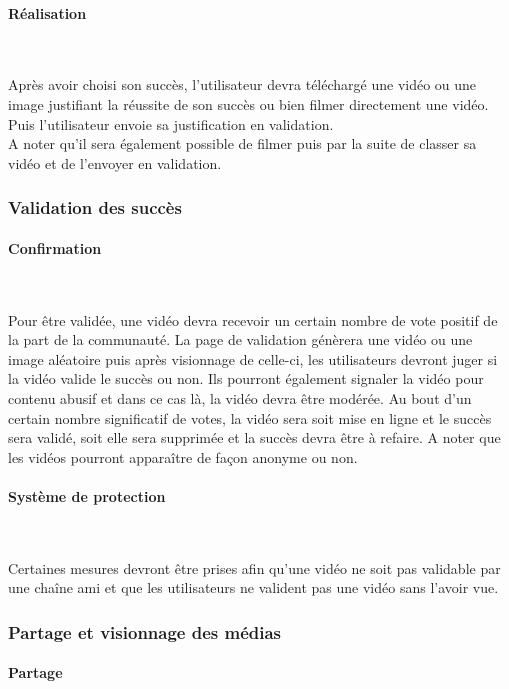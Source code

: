\documentclass[a4paper,10pt]{article}
\begin{document}
\paragraph{Réalisation}~\

Après avoir choisi son succès, l'utilisateur devra téléchargé une vidéo ou une image justifiant la réussite de son succès ou bien filmer directement une vidéo. Puis l'utilisateur envoie sa justification en validation.\\
A noter qu'il sera également possible de filmer puis par la suite de classer sa vidéo et de l'envoyer en validation.

\subsubsection{Validation des succès}

\paragraph{Confirmation}~\

Pour être validée, une vidéo devra recevoir un certain nombre de vote positif de la part de la communauté. La page de validation génèrera une vidéo ou une image aléatoire puis après visionnage de celle-ci, les utilisateurs devront juger si la vidéo valide le succès ou non. Ils pourront également signaler la vidéo pour contenu abusif et dans ce cas là, la vidéo devra être modérée. Au bout d'un certain nombre significatif de votes, la vidéo sera soit mise en ligne et le succès sera validé, soit elle sera supprimée et la succès devra être à refaire.
A noter que les vidéos pourront apparaître de façon anonyme ou non.

\paragraph{Système de protection}~\

Certaines mesures devront être prises afin qu'une vidéo ne soit pas validable par une chaîne ami et que les utilisateurs ne valident pas une vidéo sans l'avoir vue.

\subsubsection{Partage et visionnage des médias}

\paragraph{Partage}~\
\end{document}
